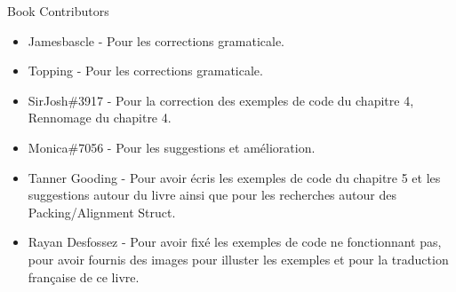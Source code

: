 \large Book Contributors \newline
\begin{itemize}
	\item Jamesbascle - Pour les corrections gramaticale.
	\item Topping - Pour les corrections gramaticale.
	\item SirJosh\#3917 - Pour la correction des exemples de code du chapitre 4, Rennomage du chapitre 4.
	\item Monica\#7056 - Pour les suggestions et amélioration.
	\item Tanner Gooding - Pour avoir écris les exemples de code du chapitre 5 et les suggestions autour du livre ainsi que pour les recherches autour des Packing/Alignment Struct.
	\item Rayan Desfossez - Pour avoir fixé les exemples de code ne fonctionnant pas, pour avoir fournis des images pour illuster les exemples et pour la traduction française de ce livre.
\end{itemize}

\newpage
